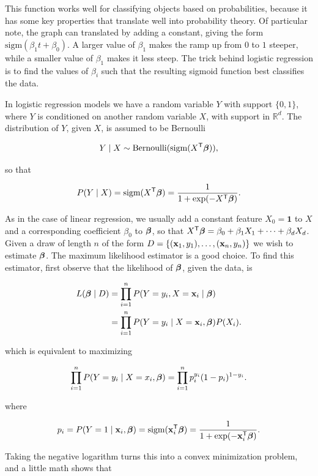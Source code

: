 This function works well for classifying objects based on probabilities, because it has some key properties that translate well into probability theory.
Of particular note, the graph can translated by adding a constant, giving the form $\text{sigm}( \beta_1 t + \beta_0)$.
A larger value of $\beta_1$ makes the ramp up from $0$ to $1$ steeper, while a smaller value of $\beta_1$ makes it less steep.
The trick behind logistic regression is to find the values of $\beta_i$ such that the resulting sigmoid function best classifies the data.

In logistic regression models we have a random variable $Y$ with support $\{0,1\}$, where $Y$ is conditioned on another random variable $X$, with support in $\mathbb{R}^d$.
The distribution of $Y$, given $X$, is assumed to be Bernoulli

\[
Y \mid X \sim \text{Bernoulli}(\text{sigm}(X^{\mathsf T}\boldsymbol\beta)),
\]

so that

\[
    P(Y \mid X) = \text{sigm}(X^{\mathsf T}\boldsymbol\beta) = \frac{1}{1 + \text{exp}(-X^{\mathsf T}\boldsymbol\beta)}.
\]

As in the case of linear regression, we usually add a constant feature $X_0=\boldsymbol{1}$ to $X$ and a corresponding coefficient $\beta_0$ to $\boldsymbol\beta$, so that $X^{\mathsf T} \boldsymbol\beta = \beta_0 + \beta_1 X_1 + \cdots + \beta_d X_d$.
Given a draw of length $n$ of the form $D = \{(\mathbf{x}_1,y_1),\dots, (\mathbf{x}_n,y_n)\}$ we wish to estimate $\boldsymbol\beta$.
The maximum likelihood estimator is a good choice.
To find this estimator, first observe that the likelihood of $\boldsymbol\beta$, given the data, is

\begin{align*}
    L(\bbeta \mid D)
    &= \prod_{i=1}^n P(Y=y_i, X = \x_i \mid \bbeta)\\
    &= \prod_{i=1}^n P(Y=y_i \mid X = \x_i,  \bbeta) P( X_i).       %
\end{align*}

which is equivalent to maximizing

\[
    \prod_{i=1}^n P(Y=y_i \mid X=x_i, \boldsymbol\beta) = \prod_{i=1}^n p_i^{y_i}(1-p_i)^{1-y_i}.
\]

where

\[
p_i = P(Y=1 \mid \mathbf{x}_i, \boldsymbol\beta) = \text{sigm}(\mathbf{x}_i^\mathsf{T} \boldsymbol\beta) =  \frac{1}{1 + \exp(- \mathbf{x}_i^\mathsf{T} \boldsymbol\beta)}.
\]

\noindent Taking the negative logarithm turns this into a convex minimization problem, and a little math shows that

